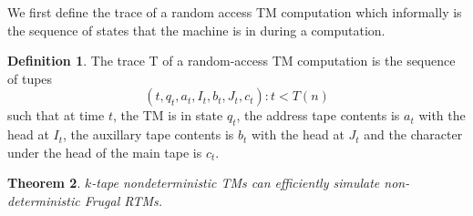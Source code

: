 \documentclass[english]{article}
\theoremstyle{plain}
\newtheorem{thm}{Theorem}
\theoremstyle{definition}
\newtheorem{defn}[thm]{Definition}
\theoremstyle{plain}
\begin{document}
We first define the trace of a random access TM computation which informally is the sequence of states that the machine is in during a computation.

\begin{defn}
The trace T of a random-access TM computation is the sequence of tupes
\[
(t,q_t,a_t,I_t,b_t,J_t,c_t): t < T(n)
\]
such that at time $t$, the TM is in state $q_t$, the address tape contents is $a_t$ with the head at $I_t$, the auxillary tape contents is $b_t$ with the head at $J_t$  and the character under the head of the main tape is $c_t$.
\end{defn}

\begin{thm}
$k$-tape nondeterministic TMs can efficiently simulate non-deterministic Frugal RTMs.
\end{thm}
\end{document}
